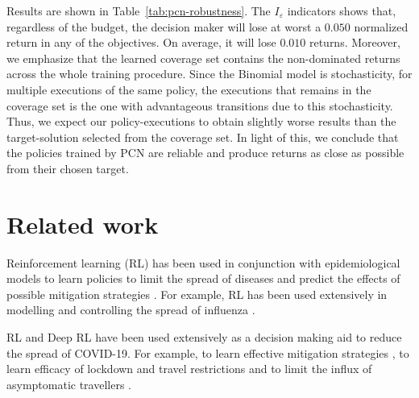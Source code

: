 \documentclass{article}
\renewcommand{\cite}[1]{\citep{#1}}
\begin{document}
Results are shown in Table~\ref{tab:pcn-robustness}. The $I_\varepsilon$ indicators shows that, regardless of the budget, the decision maker will lose at worst a $0.050$ normalized return in any of the objectives. On average, it will lose $0.010$ returns. Moreover, we emphasize that the learned coverage set contains the non-dominated returns across the whole training procedure. Since the Binomial model is stochasticity, for multiple executions of the same policy, the executions that remains in the coverage set is the one with advantageous transitions due to this stochasticity. Thus, we expect our policy-executions to obtain slightly worse results than the target-solution selected from the coverage set. In light of this, we conclude that the policies trained by PCN are reliable and produce returns as close as possible from their chosen target.

\section{Related work}
Reinforcement learning (RL) has been used in conjunction with epidemiological models to learn policies to limit the spread of diseases and predict the effects of possible mitigation strategies \cite{probert2019context,ernst2006clinical}. For example, RL has been used extensively in modelling and controlling the spread of influenza \cite{das2008large,libin2020,libin2018bayesian}.
 
RL and Deep RL have been used extensively as a decision making aid to reduce the spread of COVID-19. For example, to learn effective mitigation strategies \cite{ohi2020exploring}, to learn efficacy of lockdown and travel restrictions \cite{kwak2021covid} and to limit the influx of asymptomatic travellers \cite{bastani2021efficient}.
\end{document}
